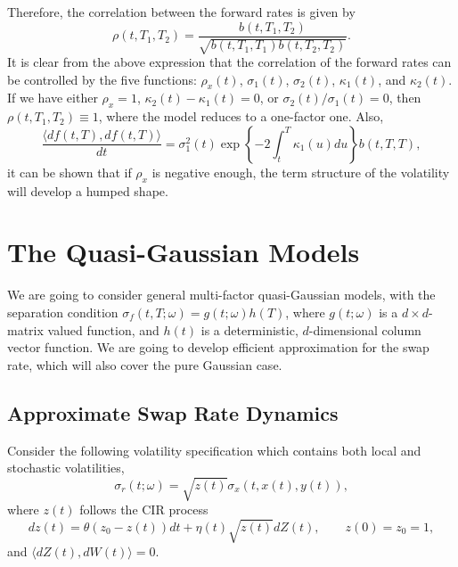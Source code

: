 \documentclass[12pt]{article}
\begin{document}
  Therefore, the correlation between the forward rates is given by
  \begin{equation}
    \rho(t,T_1,T_2)=\frac{b(t,T_1,T_2)}{\sqrt{b(t,T_1,T_1)b(t,T_2,T_2)}}.
  \end{equation}
  It is clear from the above expression that the correlation of the forward rates can be controlled by the five functions: $\rho_x(t)$,
  $\sigma_1(t)$, $\sigma_2(t)$, $\kappa_1(t)$, and $\kappa_2(t)$. If we have either $\rho_x=1$, $\kappa_2(t)-\kappa_1(t)=0$, or $\sigma_2(t)/\sigma_1(t)=0$,
  then $\rho(t,T_1,T_2)\equiv 1$, where the model reduces to a one-factor one. Also,
  \begin{equation}
    \frac{\langle df(t,T), df(t,T)\rangle}{dt}=\sigma_1^2(t)\exp\left\{-2\int_t^{T}\kappa_1(u)du\right\}b(t,T,T),
  \end{equation}
  it can be shown that if $\rho_x$ is negative enough, the term structure of the volatility will develop a humped shape.


\section{The Quasi-Gaussian Models}

  We are going to consider general multi-factor quasi-Gaussian models, with the separation condition $\sigma_f(t,T;\omega)=g(t;\omega)h(T)$,
  where $g(t;\omega)$ is a $d\times d$-matrix valued function, and $h(t)$ is a deterministic, $d$-dimensional column vector function.
  We are going to develop efficient approximation for the swap rate, which will also cover the pure Gaussian case.

  \subsection{Approximate Swap Rate Dynamics}
  \label{qGS}

    Consider the following volatility specification which contains both local and stochastic volatilities,
    \begin{equation}
      \sigma_r(t;\omega) = \sqrt{z(t)}\sigma_x(t,x(t), y(t)),
    \end{equation}
    where $z(t)$ follows the CIR process
    \begin{equation}
      dz(t)=\theta(z_0-z(t))dt+\eta(t)\sqrt{z(t)}dZ(t),\quad\quad z(0)=z_0=1,
    \end{equation}
    and $\langle dZ(t),dW(t)\rangle=0$.
\end{document}
